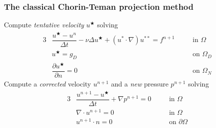 \begin{frame}
  \frametitle{The classical Chorin-Teman projection method}
   
   Compute \emph{tentative velocity}
  $u^{\bigstar}$ solving 
  \begin{alignat*}{3}
    &\dfrac{u^{\bigstar} - u^{n}}{\Delta t}  - \nu \Delta u^{\bigstar} +
    (u^{\ast} \cdot \nabla) u^{\ast \ast} = f^{n+1}
    & &\quad \text{in } \Omega 
    \\
    &u^{\bigstar} = g_D 
    & &\quad \text{on } \Omega_D 
    \\
    &\dfrac{\partial u^{\bigstar}}{\partial n} = 0
    & &\quad \text{on } \Omega_N
  \end{alignat*}
   Compute a \emph{corrected} velocity $u^{n+1}$
  and a \emph{new} pressure $p^{n+1}$ solving
  \begin{alignat*}{3}
    &\dfrac{u^{n+1} - u^{\bigstar}}{\Delta t} + \nabla p^{n+1}
    = 0
    & &\quad \text{in } \Omega
    \\
    & \nabla \cdot u^{n+1} = 0
    & &\quad \text{in } \Omega 
    \\
    & u^{n+1} \cdot n = 0
    & &\quad \text{on } \partial \Omega
  \end{alignat*}
\end{frame}
